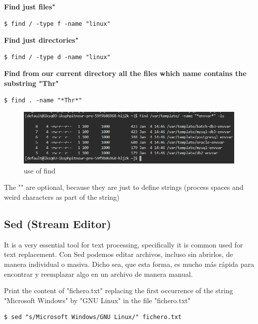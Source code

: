 \documentclass{article}
\newenvironment{blocktemplateII}[1]{%
    \tcolorbox[beamer,%
    noparskip,breakable,
    colframe=Green,%
    colbacklower=LimeGreen!75!LightGreen,%
    title=#1]}%
    {\endtcolorbox}
\newenvironment{codetemplate}[1][]{%
  \mybasecolorbox[#1]
  \itshape
}{%
  \endmybasecolorbox
}
\begin{document}
\textbf{Find just files"}
\begin{codetemplate}{}
\begin{verbatim}
$ find / -type f -name "linux"
\end{verbatim}
\end{codetemplate}

\textbf{Find just directories"}
\begin{codetemplate}{}
\begin{verbatim}
$ find / -type d -name "linux"
\end{verbatim}
\end{codetemplate}

\textbf{Find from our current directory all the files which name contains the substring "Thr"}
\begin{codetemplate}{}
\begin{verbatim}
$ find . -name "*Thr*" 
\end{verbatim}
\end{codetemplate}

\begin{figure}[H]
    \centering
    \includegraphics[scale=0.7]{pictures/image3.png}
    \caption{use of find}
\end{figure}

\begin{blocktemplateII}{NOTE}
The "" are optional, because they are just to define strings (process spaces and weird characters as part of the string)
\end{blocktemplateII}


\subsection{Sed (Stream Editor)}

 It is a very essential tool for text processing, specifically it is common used for text replacement. Con Sed podemos editar archivos, incluso sin abrirlos, de manera individual o masiva. Dicho sea, que esta forma, es mucho más rápida para encontrar y reemplazar algo en un archivo de manera manual.

 Print the content of "fichero.txt" replacing the first occurrence of the string "Microsoft Windows" by "GNU Linux" in the file "fichero.txt"
\begin{codetemplate}{}
\begin{verbatim}
$ sed "s/Microsoft Windows/GNU Linux/" fichero.txt
\end{verbatim}
\end{codetemplate}
\end{document}
